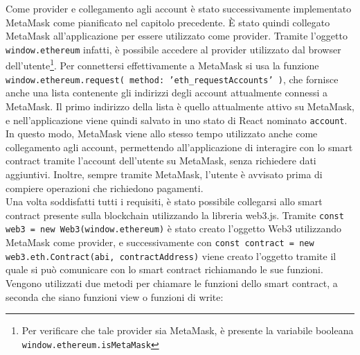 \documentclass[12pt,a4paper,openright,twoside]{report}
\begin{document}
\label{connect_metamask}Come provider e collegamento agli account è stato successivamente implementato MetaMask come pianificato nel capitolo precedente. È stato quindi collegato MetaMask all'applicazione per essere utilizzato come provider. Tramite l'oggetto \texttt{window.ethereum} infatti, è possibile accedere al provider utilizzato dal browser dell'utente\footnote{Per verificare che tale provider sia MetaMask, è presente la variabile booleana \texttt{window.ethereum.isMetaMask}}. Per connettersi effettivamente a MetaMask si usa la funzione \texttt{window.ethereum.request({ method: 'eth\_requestAccounts' })}, che fornisce anche una lista contenente gli indirizzi degli account attualmente connessi a MetaMask. Il primo indirizzo della lista è quello attualmente attivo su MetaMask, e nell'applicazione viene quindi salvato in uno stato di React nominato \texttt{account}. In questo modo, MetaMask viene allo stesso tempo utilizzato anche come collegamento agli account, permettendo all'applicazione di interagire con lo smart contract tramite l'account dell'utente su MetaMask, senza richiedere dati aggiuntivi. Inoltre, sempre tramite MetaMask, l'utente è avvisato prima di compiere operazioni che richiedono pagamenti.\\
Una volta soddisfatti tutti i requisiti, è stato possibile collegarsi allo smart contract presente sulla blockchain utilizzando la libreria web3.js. Tramite \texttt{const web3 = new Web3(window.ethereum)} è stato creato l'oggetto Web3 utilizzando MetaMask come provider, e successivamente con \texttt{const contract = new web3.eth.Contract(abi, contractAddress)} viene creato l'oggetto tramite il quale si può comunicare con lo smart contract richiamando le sue funzioni. Vengono utilizzati due metodi per chiamare le funzioni dello smart contract, a seconda che siano funzioni view o funzioni di write:
\end{document}
